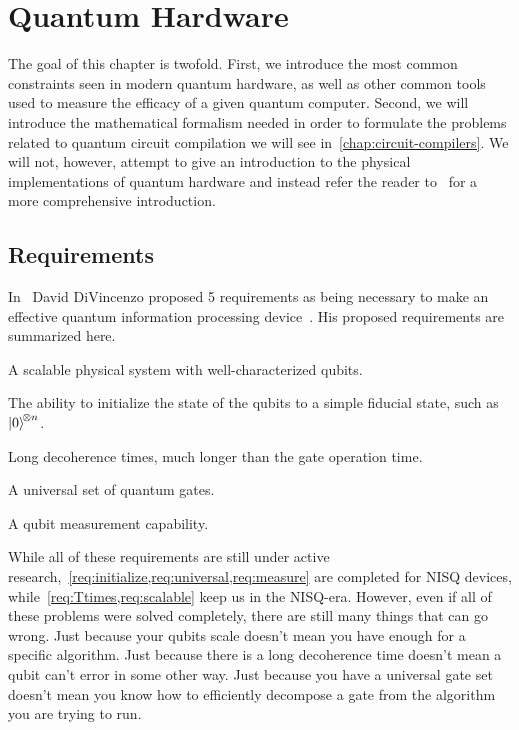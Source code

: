 \chapter{Quantum Hardware}\label{chap:hardware}

The goal of this chapter is twofold.
First, we introduce the most common constraints seen in modern quantum hardware, as well as other common tools used to measure the efficacy of a given quantum computer.
Second, we will introduce the mathematical formalism needed in order to formulate the problems related to quantum circuit compilation we will see in~\cref{chap:circuit-compilers}.
We will not, however, attempt to give an introduction to the physical implementations of quantum hardware and instead refer the reader to~\cite[Chapter 7]{nielsenchuang} for a more comprehensive introduction.

\section{Requirements}

In~\citeyear{divincenzo} David DiVincenzo proposed 5 requirements as being necessary to make an effective quantum information processing device~\cite{divincenzo}.
His proposed requirements are summarized here.
\begin{requirements}
    \item A scalable physical system with well-characterized qubits.\label{req:scalable}
    \item The ability to initialize the state of the qubits to a simple fiducial state, such as $\ket{0}^{\!\otimes n}$.\label{req:initialize}
    \item Long decoherence times, much longer than the gate operation time.\label{req:Ttimes}
    \item A universal set of quantum gates.\label{req:universal}
    \item A qubit measurement capability.\label{req:measure}
\end{requirements}
While all of these requirements are still under active research,~\cref{req:initialize,req:universal,req:measure} are completed for \ac{NISQ} devices, while~\cref{req:Ttimes,req:scalable} keep us in the \ac{NISQ}-era.
However, even if all of these problems were solved completely, there are still many things that can go wrong.
Just because your qubits scale doesn't mean you have enough for a specific algorithm.
Just because there is a long decoherence time doesn't mean a qubit can't error in some other way.
Just because you have a universal gate set doesn't mean you know how to efficiently decompose a gate from the algorithm you are trying to run.

